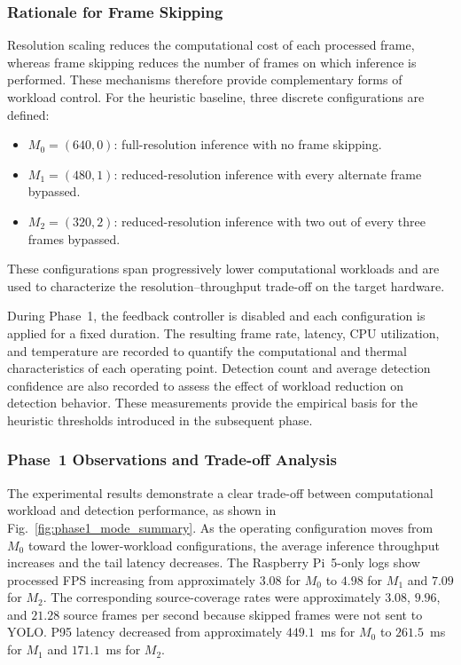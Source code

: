 \documentclass{ieeeaccess}
\begin{document}
\subsubsection*{Rationale for Frame Skipping}

Resolution scaling reduces the computational cost of each processed frame,
whereas frame skipping reduces the number of frames on which inference is
performed. These mechanisms therefore provide complementary forms of
workload control. For the heuristic baseline, three discrete configurations
are defined:

\begin{itemize}
    \item $M_0=(640,0)$: full-resolution inference with no frame skipping.
    
    \item $M_1=(480,1)$: reduced-resolution inference with every alternate
    frame bypassed.
    
    \item $M_2=(320,2)$: reduced-resolution inference with two out of every
    three frames bypassed.
\end{itemize}

These configurations span progressively lower computational workloads and are
used to characterize the resolution--throughput trade-off on the target
hardware.

During Phase~1, the feedback controller is disabled and each configuration is
applied for a fixed duration. The resulting frame rate, latency, CPU
utilization, and temperature are recorded to quantify the computational and
thermal characteristics of each operating point. Detection count and average
detection confidence are also recorded to assess the effect of workload
reduction on detection behavior. These measurements provide the empirical
basis for the heuristic thresholds introduced in the subsequent phase.

\subsubsection*{Phase~1 Observations and Trade-off Analysis}

The experimental results demonstrate a clear trade-off between computational
workload and detection performance, as shown in Fig.~\ref{fig:phase1_mode_summary}.
As the operating configuration moves from $M_0$ toward the lower-workload
configurations, the average inference throughput increases and the tail
latency decreases. The Raspberry Pi~5-only logs show processed FPS increasing from approximately
$3.08$ for $M_0$ to $4.98$ for $M_1$ and $7.09$ for $M_2$. The corresponding
source-coverage rates were approximately $3.08$, $9.96$, and $21.28$ source
frames per second because skipped frames were not sent to YOLO. P95 latency
decreased from approximately $449.1$~ms for $M_0$ to $261.5$~ms for $M_1$
and $171.1$~ms for $M_2$.
\end{document}
